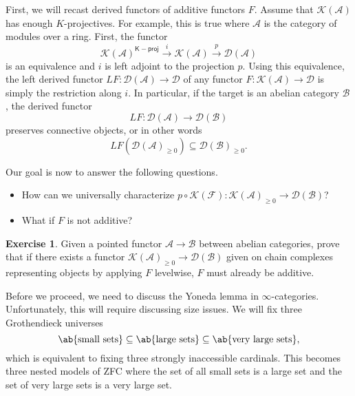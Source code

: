 \documentclass[10pt]{amsart}
\theoremstyle{definition}
\newtheorem{exer}[thm]{Exercise}
\theoremstyle{remark}
\theoremstyle{plain}
\theoremstyle{definition}
\theoremstyle{remark}
\newcommand{\mc}[1]{\mathcal{#1}}
\newcommand{\ms}[1]{\mathsf{#1}}
\newcommand{\1}{\mathbf{1}}
\newcommand{\2}{\mathbf{2}}
\newcommand{\3}{\mathbf{3}}
\begin{document}
First, we will recast derived functors of additive functors $F$. Assume that $\mc{K}(\mc{A})$ has enough $K$-projectives. For example, this is true where $\mc{A}$ is the category of modules over a ring. First, the functor
\[ \mc{K}(\mc{A})^{\ms{K-proj}} \xrightarrow{i} \mc{K}(\mc{A}) \xrightarrow{p} \mc{D}(\mc{A}) \]
is an equivalence and $i$ is left adjoint to the projection $p$. Using this equivalence, the left derived functor $LF \colon \mc{D}(\mc{A}) \to \mc{D}$ of any functor $F \colon \mc{K}(\mc{A}) \to \mc{D}$ is simply the restriction along $i$. In particular, if the target is an abelian category $\mc{B}$, the derived functor
\[ LF \colon \mc{D}(\mc{A}) \to \mc{D}(\mc{B}) \]
preserves connective objects, or in other words
\[ LF(\mc{D}(\mc{A})_{\geq 0}) \subseteq \mc{D}(\mc{B})_{\geq 0}. \]

Our goal is now to answer the following questions.
\begin{itemize}
    \item How can we universally characterize $p \circ \mc{K}(\mc{F}) \colon \mc{K}(\mc{A})_{\geq 0} \to \mc{D}(\mc{B})$?
    \item What if $F$ is not additive?
\end{itemize}

\begin{exer}
    Given a pointed functor $\mc{A} \to \mc{B}$ between abelian categories, prove that if there exists a functor $\mc{K}(\mc{A})_{\geq 0} \to \mc{D}(\mc{B})$ given on chain complexes representing objects by applying $F$ levelwise, $F$ must already be additive.
\end{exer}

Before we proceed, we need to discuss the Yoneda lemma in $\infty$-categories. Unfortunately, this will require discussing size issues. We will fix three Grothendieck universes
\[ \ab\{ \text{small sets}\} \subseteq \ab\{ \text{large sets} \} \subseteq \ab\{ \text{very large sets} \}, \]
which is equivalent to fixing three strongly inaccessible cardinals. This becomes three nested models of ZFC where the set of all small sets is a large set and the set of very large sets is a very large set.
\end{document}
